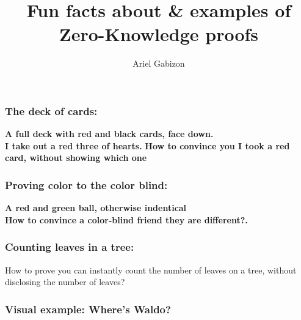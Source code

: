 \documentclass[shadesubsections,trans,14pt,mathserif]{beamer}
\title{\LARGE{Fun facts about & examples of Zero-Knowledge proofs}}    %
\author{\Large{Ariel Gabizon}}                 %
\institute{\normalsize{Protocol Labs}}      %
\date{}                    %
\begin{document}
\boldmath
\begin{frame}
  \titlepage
\end{frame}



\begin{frame}
  \frametitle{The deck of cards:}   %
\textbf{A full deck with red and black cards, face down.}\\
 \vspace{0.4in}
\textbf{I take out a red three of hearts.}
 \vspace{0.4in}
\textbf{How to convince you I took a red card, without showing which one}
\end{frame}
\begin{frame}
  \frametitle{Proving color to the color blind:}   %
\textbf{A red and green ball, otherwise indentical}\\
 \vspace{0.4in}
\textbf{How to convince a color-blind friend they are different?.}
 \vspace{0.4in}

\end{frame}

\begin{frame}
  \frametitle{Counting leaves in a tree:}   %
How to prove you can instantly count the number of leaves on a tree, without disclosing the number of leaves?
\end{frame}


\begin{frame}
  \frametitle{Visual example: Where's Waldo?}   %

\end{frame}
\end{document}
